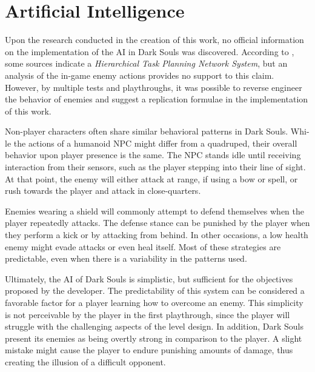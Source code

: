 
\section{Artificial Intelligence}

Upon the research conducted in the creation of this work, no official information on the implementation of the AI in Dark Souls was discovered. According to , some sources indicate a \emph{Hierarchical Task Planning Network System}, but an analysis of the in-game enemy actions provides no support to this claim. However, by multiple tests and playthroughs, it was possible to reverse engineer the behavior of enemies and suggest a replication formulae in the implementation of this work.

Non-player characters often share similar behavioral patterns in Dark Souls. Whi\hyp{}le the actions of a humanoid NPC might differ from a quadruped, their overall behavior upon player presence is the same. The NPC stands idle until receiving interaction from their sensors, such as the player stepping into their line of sight. At that point, the enemy will either attack at range, if using a bow or spell, or rush towards the player and attack in close-quarters.

Enemies wearing a shield will commonly attempt to defend themselves when the player repeatedly attacks. The defense stance can be punished by the player when they perform a kick or by attacking from behind. In other occasions, a low health enemy might evade attacks or even heal itself. Most of these strategies are predictable, even when there is a variability in the patterns used.

Ultimately, the AI of Dark Souls is simplistic, but sufficient for the objectives proposed by the developer. The predictability of this system can be considered a favorable factor for a player learning how to overcome an enemy. This simplicity is not perceivable by the player in the first playthrough, since the player will struggle with the challenging aspects of the level design. In addition, Dark Souls present its enemies as being overtly strong in comparison to the player. A slight mistake might cause the player to endure punishing amounts of damage, thus creating the illusion of a difficult opponent.

